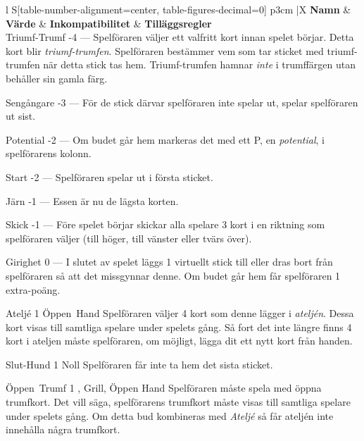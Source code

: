 \begin{table}
	\caption{Specialbud}\label{tab:specialBids}
	\begin{center}
		\begin{tabularx}{\textwidth}{
			l
			S[table-number-alignment=center, table-figures-decimal=0]
			p{3cm}
			|X
		}
			\textbf{Namn} &
			\textbf{Värde} &
			\textbf{Inkompatibilitet} &
			\textbf{Tilläggsregler}
			\\[-3ex]

			\specialBidItem%
			{Triumf-Trumf}
			{-4}
			{---}
			{%
				Spelföraren väljer ett valfritt kort innan spelet börjar. Detta kort blir \emph{triumf-trumfen}. Spelföraren bestämmer vem som tar sticket med triumf-trumfen när detta stick tas hem. Triumf-trumfen hamnar \emph{inte} i trumffärgen utan behåller sin gamla färg.
			}

			\specialBidItem%
			{Sengångare}
			{-3}
			{---}
			{%
				För de stick därvar spelföraren inte spelar ut, spelar spelföraren ut sist.
			}

			\specialBidItem%
			{Potential}
			{-2}
			{---}
			{%
				Om budet går hem markeras det med ett P, en \emph{potential}, i spelförarens kolonn.
			}

			\specialBidItem%
			{Start}
			{-2}
			{---}
			{%
				Spelföraren spelar ut i första sticket.
			}

			\specialBidItem%
			{Järn}
			{-1}
			{---}
			{%
				Essen är nu de lägsta korten.
			}

			\specialBidItem%
			{Skick}
			{-1}
			{---}
			{%
				Före spelet börjar skickar alla spelare 3 kort i en riktning som spelföraren väljer (till höger, till vänster eller tvärs över).
			}

			\specialBidItem%
			{Girighet}
			{0}
			{---}
			{%
				I slutet av spelet läggs 1 virtuellt stick till eller dras bort från spelföraren så att det missgynnar denne. Om budet går hem får spelföraren 1 extra-poäng.
			}

			\specialBidItem%
			{Ateljé}
			{1}
			{Öppen~Hand}
			{%
				Spelföraren väljer 4 kort som denne lägger i \emph{ateljén}. Dessa kort visas till samtliga spelare under spelets gång. Så fort det inte längre finns 4 kort i ateljen måste spelföraren, om möjligt, lägga dit ett nytt kort från handen.
			}

			\specialBidItem%
			{Slut-Hund}
			{1}
			{Noll}
			{%
				Spelföraren får inte ta hem det sista sticket.
			}

			\specialBidItem%
			{Öppen~Trumf}
			{1}
			{\nonTrump, Grill, Öppen Hand}
			{%
				Spelföraren måste spela med öppna trumfkort. Det vill säga, spelförarens trumfkort måste visas till samtliga spelare under spelets gång. Om detta bud kombineras med \emph{Ateljé} så får ateljén inte innehålla några trumfkort.
			}


\end{tabularx}
\end{center}
\end{table}
